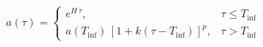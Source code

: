 \documentclass[preview]{standalone}
\begin{document}
\begin{align*}
a(\tau)  = \begin{cases}e^{ H \,\tau}, & \tau\le  T_{\mathrm{inf}} \\ a( T_{\mathrm{inf}} )\,[1+ k (\tau- T_{\mathrm{inf}} )]^ p , & \tau> T_{\mathrm{inf}} \end{cases}
\end{align*}
\end{document}
